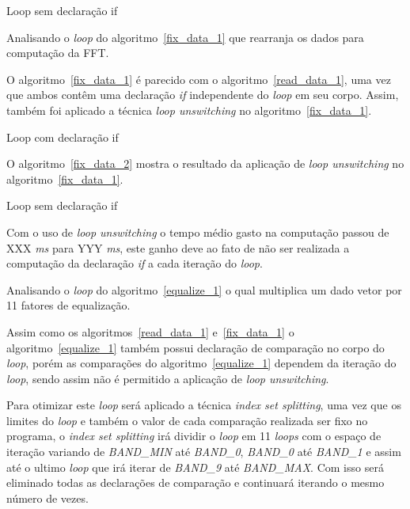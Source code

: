 \begin{algorithm}
    \caption{Loop sem declaração if }
    \label{read_data_2}

\end{algorithm}


Analisando o \textit{loop} do algoritmo~\ref{fix_data_1} que rearranja os dados
para computação da FFT. 

O algoritmo~\ref{fix_data_1} é parecido com o algoritmo~\ref{read_data_1}, uma
vez que ambos contêm uma declaração \textit{if} independente do \textit{loop} em seu corpo. 
Assim, também foi aplicado a técnica \textit{loop unswitching} no
algoritmo~\ref{fix_data_1}.


\begin{algorithm}
    \caption{Loop com declaração if }
    \label{fix_data_1}

\end{algorithm}

O algoritmo~\ref{fix_data_2} mostra o resultado da aplicação de \textit{loop
unswitching} no algoritmo~\ref{fix_data_1}.

\begin{algorithm}
    \caption{Loop sem declaração if }
    \label{fix_data_2}

\end{algorithm}

Com o uso de \textit{loop unswitching} o tempo médio gasto na computação passou
de XXX \textit{ms} para YYY \textit{ms}, este ganho deve ao fato de não ser
realizada a computação da declaração \textit{if} a cada iteração do
\textit{loop}.


Analisando o \textit{loop} do algoritmo~\ref{equalize_1} o qual multiplica um dado 
vetor por 11 fatores de equalização.

Assim como os algoritmos~\ref{read_data_1} e~\ref{fix_data_1} o
algoritmo~\ref{equalize_1} também possui declaração de comparação no corpo do
\textit{loop}, porém as comparações do algoritmo~\ref{equalize_1} dependem da
iteração do \textit{loop}, sendo assim não é permitido a aplicação de
\textit{loop unswitching}.

Para otimizar este \textit{loop} será aplicado a técnica \textit{index set
splitting}, uma vez que os limites do \textit{loop} e também o valor de cada
comparação realizada ser fixo no programa, o \textit{index set splitting} irá
dividir o \textit{loop} em 11 \textit{loops} com o espaço de iteração variando
de \textit{BAND\_MIN} até \textit{BAND\_0}, \textit{BAND\_0} até \textit{BAND\_1} e
assim até o ultimo \textit{loop} que irá iterar de \textit{BAND\_9} até
\textit{BAND\_MAX}. Com isso será eliminado todas as declarações de comparação e
continuará iterando o mesmo número de vezes.

